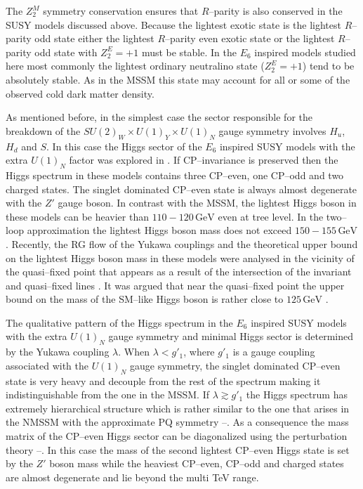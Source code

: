 \documentclass[12pt,a4paper]{article}
\begin{document}
The $Z_{2}^{M}$ symmetry conservation ensures that $R$--parity is also conserved in the SUSY models
discussed above. Because the lightest exotic state is the lightest $R$--parity odd state either the lightest
$R$--parity even exotic state or the lightest $R$--parity odd state with $Z_{2}^{E}=+1$ must be
stable. In the $E_6$ inspired models studied here most commonly the lightest ordinary neutralino state
($Z_{2}^{E}=+1$) tend to be absolutely stable. As in the MSSM this state may account for all or some
of the observed cold dark matter density.

As mentioned before, in the simplest case the sector responsible for the breakdown of the
$SU(2)_W\times U(1)_Y\times U(1)_{N}$ gauge symmetry involves $H_u$, $H_d$ and $S$. In this case
the Higgs sector of the $E_6$ inspired SUSY models with the extra $U(1)_{N}$ factor was explored in \cite{King:2005jy}.
If CP--invariance is preserved then the Higgs spectrum in these models contains three CP--even, one CP--odd
and two charged states.  The singlet dominated CP--even state is always almost degenerate with the $Z'$ gauge
boson. In contrast with the MSSM, the lightest Higgs boson in these models can be heavier than $110-120\,\mbox{GeV}$
even at tree level. In the two--loop approximation the lightest Higgs boson mass does not exceed $150-155\,\mbox{GeV}$
\cite{King:2005jy}. Recently, the RG flow of the Yukawa couplings and the theoretical upper bound on
the lightest Higgs boson mass in these models were analysed in the vicinity of the quasi--fixed point \cite{Nevzorov:2013ixa}
that appears as a result of the intersection of the invariant and quasi--fixed lines \cite{Nevzorov:2001vj}.
It was argued that near the quasi--fixed point the upper bound on the mass of the SM--like Higgs boson is
rather close to $125\,\mbox{GeV}$ \cite{Nevzorov:2013ixa}.

The qualitative pattern of the Higgs spectrum
in the $E_6$ inspired SUSY models with the extra $U(1)_{N}$ gauge symmetry and minimal Higgs sector
is determined by the Yukawa coupling $\lambda$. When $\lambda < g'_1$, where $g'_1$ is a gauge coupling
associated with the $U(1)_{N}$ gauge symmetry, the singlet dominated CP--even state is very heavy and
decouple from the rest of the spectrum making it indistinguishable from the one in the MSSM. If $\lambda\gtrsim g'_1$
the Higgs spectrum has extremely hierarchical structure which is rather similar to the one that arises in the NMSSM
with the approximate PQ symmetry \cite{Miller:2005qua}--\cite{Nevzorov:2004ge}. As a consequence
the mass matrix of the CP--even Higgs sector can be diagonalized using the perturbation theory
\cite{Nevzorov:2004ge}--\cite{Nevzorov:2001um}. In this case the mass of the second lightest CP--even
Higgs state is set by the $Z'$ boson mass while the heaviest CP--even, CP--odd and charged states
are almost degenerate and lie beyond the multi TeV range.
\end{document}
